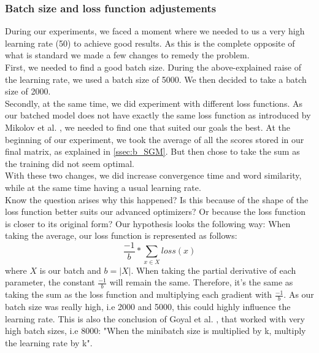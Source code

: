 \documentclass[conference]{IEEEtran}
\begin{document}
\subsubsection{Batch size and loss function adjustements}\label{ssec:bs_lf}
During our experiments, we faced a moment where we needed to us a very high learning rate (50) to achieve good results. As this is the complete opposite of what is standard we made a few changes to remedy the problem.\\
First, we needed to find a good batch size. During the above-explained raise of the learning rate, we used a batch size of 5000. We then decided to take a batch size of 2000.\\
Secondly, at the same time, we did experiment with different loss functions. As our batched model does not have exactly the same loss function as introduced by Mikolov et al. \cite{mikolov}, we needed to find one that suited our goals the best. At the beginning of our experiment, we took the average of all the scores stored in our final matrix, as explained in \ref{ssec:b_SGM}. But then chose to take the sum as the training did not seem optimal.\\
With these two changes, we did increase convergence time and word similarity, while at the same time having a usual learning rate. \\
Know the question arises why this happened? Is this because of the shape of the loss function better suits our advanced optimizers? Or because the loss function is closer to its original form? Our hypothesis looks the following way:
When taking the average, our loss function is represented as follows:
\begin{equation}
\frac{-1}{b }* \sum_{x\in X} loss(x)
\end{equation}
where $X$ is our batch and $b = |X|$.
When taking the partial derivative of each parameter, the constant $ \frac{-1}{b }$ will remain the same. Therefore, it's the same as taking the sum as the loss function and multiplying each gradient with $\frac{-1}{b }$. As our batch size was really high, i.e 2000 and 5000, this could highly influence the learning rate. This is also the conclusion of Goyal et al. \cite{fb}, that worked with very high batch sizes, i.e 8000: "When the minibatch size is multiplied by k, multiply the learning rate by k".
\end{document}
